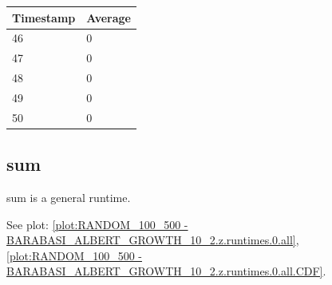 \begin{tabular}{|l||l|}
\hline
	\textbf{Timestamp} & \textbf{Average} \\ \hline
	46 & 0 \\ \hline
	47 & 0 \\ \hline
	48 & 0 \\ \hline
	49 & 0 \\ \hline
	50 & 0 \\ \hline
\end{tabular}

\subsection{sum}
sum is a general runtime.

See plot: \ref{plot:RANDOM_100_500 - BARABASI_ALBERT_GROWTH_10_2.z.runtimes.0.all}, \ref{plot:RANDOM_100_500 - BARABASI_ALBERT_GROWTH_10_2.z.runtimes.0.all.CDF}.

